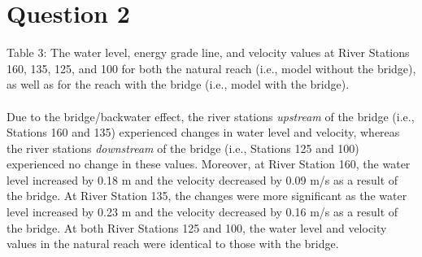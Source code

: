 \documentclass[]{article}
\begin{document}
\newpage
\section{Question 2} 
\medskip
 \begin{minipage}[t]{\linewidth}
	\centering
\medskip
	\begin{center} 
		Table 3: The water level, energy grade line, and velocity values at River Stations 160, 135, 125, and 100 for both the natural reach (i.e., model without the bridge), as well as for the reach with the bridge (i.e., model with the bridge).
	\end{center}
\end{minipage}
\medskip
\paragraph{}
\noindent Due to the bridge/backwater effect, the river stations \textit{upstream} of the bridge (i.e., Stations 160 and 135) experienced changes in water level and velocity, whereas the river stations \textit{downstream} of the bridge (i.e., Stations 125 and 100) experienced no change in these values. Moreover, at River Station 160, the water level increased by 0.18 m and the velocity decreased by 0.09 m/s as a result of the bridge. At River Station 135, the changes were more significant as the water level increased by 0.23 m and the velocity decreased by 0.16 m/s as a result of the bridge. At both River Stations 125 and 100, the water level and velocity values in the natural reach were identical to those with the bridge.
\newpage
\end{document}
